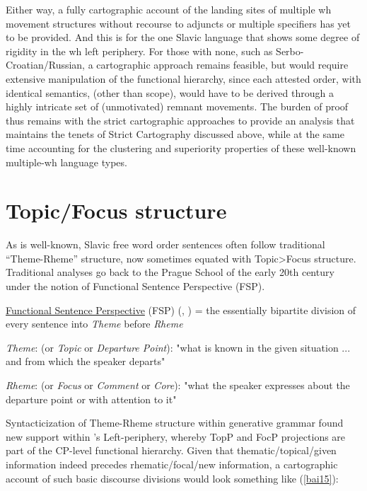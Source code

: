 \documentclass[output=paper,colorlinks,citecolor=brown,
]{langscibook}
\begin{document}
Either way, a fully cartographic account of the landing sites of multiple wh movement structures without recourse to adjuncts or multiple specifiers has yet to be provided.  And this is for the one Slavic language that shows some degree of rigidity in the wh left periphery. For those with none, such as Serbo-Croatian/Russian, a cartographic approach remains feasible, but would require extensive manipulation of the functional hierarchy, since each attested order, with identical semantics, (other than scope), would have to be derived through a highly intricate set of (unmotivated) remnant movements. The burden of proof thus remains with the strict cartographic approaches to provide an analysis that maintains the tenets of Strict Cartography discussed above, while at the same time accounting for the clustering and superiority properties of these well-known multiple-wh language types.

\section{Topic/Focus structure}

As is well-known, Slavic free word order sentences often follow traditional “Theme-Rheme” structure, now sometimes equated with Topic>Focus structure. Traditional analyses go back to the Prague School of the early 20th century under the notion of Functional Sentence Perspective (FSP). 

\begin{exe} 
\ex \label{bai14}
\begin{xlist}

\ex \label{bai14a}
\uline{Functional Sentence Perspective} (FSP) (\citealt{Mathesius1939}, \citealt{Adamec1966}) = the essentially bipartite division of every sentence into \emph{Theme} before \emph{Rheme}

\ex \label{bai14b}
\emph{Theme}:  (or \emph{Topic} or \emph{Departure Point}):  "what is known in   the given situation ... and from which the speaker departs"

\ex \label{bai14c}
\emph{Rheme}:  (or \emph{Focus} or \emph{Comment} or \emph{Core}):  "what the speaker expresses about the departure point or with attention to it"

\end{xlist}
\end{exe}

Syntacticization of Theme-Rheme structure within generative grammar found new support within \citeauthor{rizzi1997}’s \citeyear{rizzi1997} Left-periphery, whereby TopP and FocP projections are part of the CP-level functional hierarchy. Given that thematic/topical/given information indeed precedes rhematic/focal/new information, a cartographic account of such basic discourse divisions would look something like (\ref{bai15}):
\end{document}
